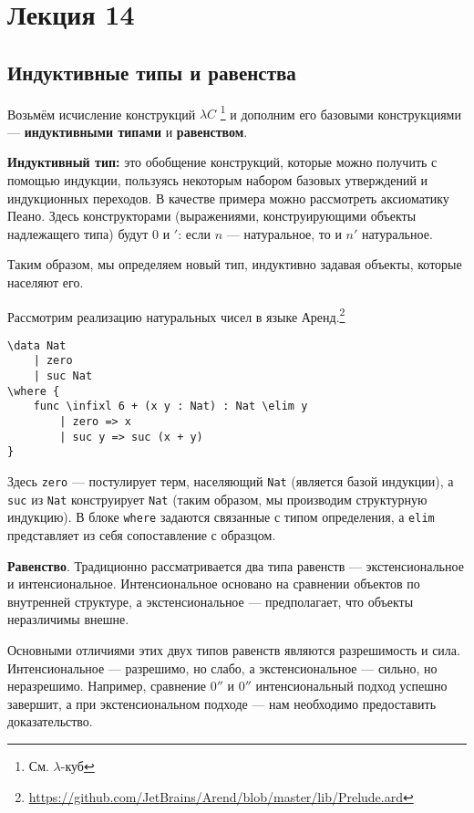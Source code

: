 \section{Лекция 14}

\newcommand{\ard}[1]{\texttt{#1}}

\subsection{Индуктивные типы и равенства}

Возьмём исчисление конструкций $\lambda C$ \footnote{См. $\lambda$-куб} и дополним его базовыми конструкциями --- \textbf{индуктивными типами} и \textbf{равенством}.

\medskip
\textbf{Индуктивный тип:} это обобщение конструкций, которые можно получить с помощью индукции,
пользуясь некоторым набором базовых утверждений и индукционных переходов. В качестве примера можно рассмотреть аксиоматику Пеано.
Здесь конструкторами (выражениями, конструирующими объекты надлежащего типа) будут $0$ и $'$: если $n$ --- натуральное, то и $n'$ натуральное.

Таким образом, мы определяем новый тип, индуктивно задавая объекты, которые населяют его.

Рассмотрим реализацию натуральных чисел в языке Аренд.\footnote{\url{https://github.com/JetBrains/Arend/blob/master/lib/Prelude.ard}}
\begin{verbatim}
\data Nat
    | zero
    | suc Nat
\where {
    func \infixl 6 + (x y : Nat) : Nat \elim y
        | zero => x
        | suc y => suc (x + y)
}
\end{verbatim}

Здесь \ard{zero} --- постулирует терм, населяющий \ard{Nat} (является базой индукции), а \ard{suc} из \ard{Nat} конструирует \ard{Nat} (таким образом, мы производим структурную индукцию).
В блоке \ard{where} задаются связанные с типом определения, а \ard{elim} представляет из себя сопоставление с образцом.

\medskip
\textbf{Равенство}. Традиционно рассматривается два типа равенств --- экстенсиональное и интенсиональное.
Интенсиональное основано на сравнении объектов по внутренней структуре, а экстенсиональное --- предполагает, что объекты неразличимы внешне.

Основными отличиями этих двух типов равенств являются разрешимость и сила. Интенсиональное --- разрешимо, но слабо, а экстенсиональное --- сильно, но неразрешимо.
Например, сравнение $0''$ и $0''$ интенсиональный подход успешно завершит, а при экстенсиональном подходе --- нам необходимо предоставить доказательство.

